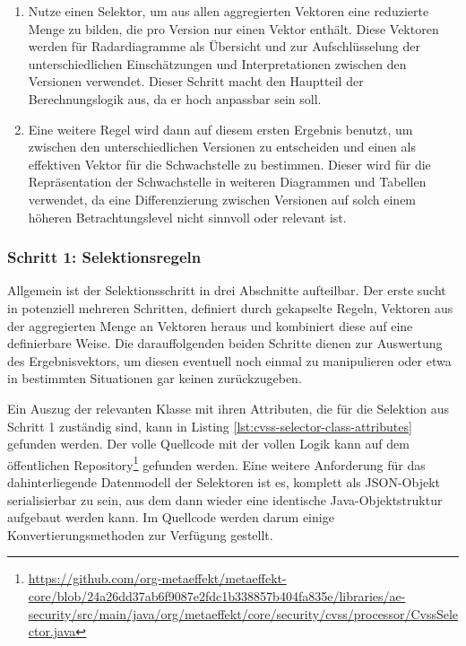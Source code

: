 \begin{enumerate}
    \item
    Nutze einen Selektor, um aus allen aggregierten Vektoren eine reduzierte Menge zu bilden, die pro Version nur einen Vektor enthält.
    Diese Vektoren werden für Radardiagramme als Übersicht und zur Aufschlüsselung der unterschiedlichen Einschätzungen und Interpretationen zwischen den Versionen verwendet.
    Dieser Schritt macht den Hauptteil der Berechnungslogik aus, da er hoch anpassbar sein soll.
    \item
    Eine weitere Regel wird dann auf diesem ersten Ergebnis benutzt, um zwischen den unterschiedlichen Versionen zu entscheiden und einen als effektiven Vektor für die Schwachstelle zu bestimmen.
    Dieser wird für die Repräsentation der Schwachstelle in weiteren Diagrammen und Tabellen verwendet, da eine Differenzierung zwischen Versionen auf solch einem höheren Betrachtungslevel nicht sinnvoll oder relevant ist.
\end{enumerate}

\subsubsection{Schritt 1: Selektionsregeln} \label{subsubsec:projektbericht-loesungsweg-cvss-selection-rules-1}

Allgemein ist der Selektionsschritt in drei Abschnitte aufteilbar.
Der erste sucht in potenziell mehreren Schritten, definiert durch gekapselte Regeln, Vektoren aus der aggregierten Menge an Vektoren heraus und kombiniert diese auf eine definierbare Weise.
Die darauffolgenden beiden Schritte dienen zur Auswertung des Ergebnisvektors, um diesen eventuell noch einmal zu manipulieren oder etwa in bestimmten Situationen gar keinen zurückzugeben.

Ein Auszug der relevanten Klasse mit ihren Attributen, die für die Selektion aus Schritt 1 zuständig sind, kann in Listing \ref{lst:cvss-selector-class-attributes} gefunden werden.
Der volle Quellcode mit der vollen Logik kann auf dem öffentlichen Repository\footnote{\url{https://github.com/org-metaeffekt/metaeffekt-core/blob/24a26dd37ab6f9087e2fdc1b338857b404fa835e/libraries/ae-security/src/main/java/org/metaeffekt/core/security/cvss/processor/CvssSelector.java}} gefunden werden.
Eine weitere Anforderung für das dahinterliegende Datenmodell der Selektoren ist es, komplett als JSON-Objekt serialisierbar zu sein, aus dem dann wieder eine identische Java-Objektstruktur aufgebaut werden kann.
Im Quellcode werden darum einige Konvertierungsmethoden zur Verfügung gestellt.

